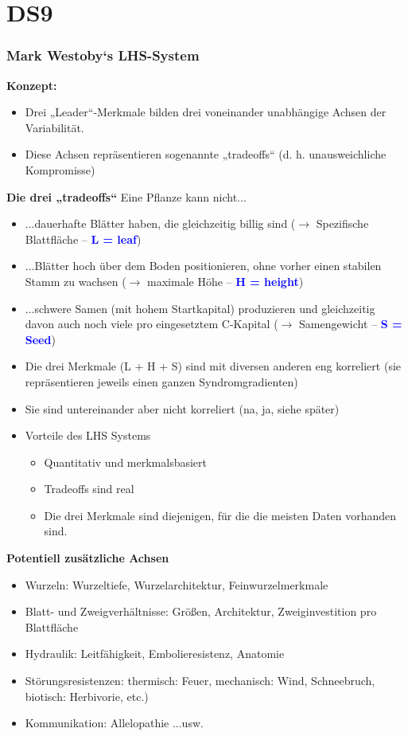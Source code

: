 \section{DS9}
\subsubsection{Mark Westoby‘s LHS-System}
\textbf{Konzept:}
\begin{itemize}
	\item Drei „Leader“-Merkmale bilden drei voneinander unabhängige Achsen der Variabilität.
	\item Diese Achsen repräsentieren sogenannte „tradeoffs“ (d. h. unausweichliche Kompromisse)
\end{itemize}

\textbf{Die drei „tradeoffs“}
Eine Pflanze kann nicht...
\begin{itemize}
	\item ...dauerhafte Blätter haben, die gleichzeitig billig sind ($\rightarrow$ Spezifische Blattfläche – \textcolor{blue}{\textbf{L = leaf}})
	\item ...Blätter hoch über dem Boden positionieren, ohne vorher einen stabilen Stamm zu wachsen ($\rightarrow$ maximale Höhe – \textcolor{blue}{\textbf{H = height}})
	\item ...schwere Samen (mit hohem Startkapital) produzieren und gleichzeitig davon auch noch viele pro eingesetztem C-Kapital ($\rightarrow$ Samengewicht – \textcolor{blue}{\textbf{S = Seed}})
	\item Die drei Merkmale (L + H + S) sind mit diversen anderen eng korreliert (sie repräsentieren jeweils einen ganzen Syndromgradienten)
	\item Sie sind untereinander aber nicht korreliert (na, ja, siehe später)
	\item Vorteile des LHS Systems
	\begin{itemize}
		\item Quantitativ und merkmalsbasiert
		\item Tradeoffs sind real
		\item Die drei Merkmale sind diejenigen, für die die meisten Daten vorhanden sind.
	\end{itemize}
\end{itemize}

\textbf{Potentiell zusätzliche Achsen}
\begin{itemize}
	\item Wurzeln: Wurzeltiefe, Wurzelarchitektur, Feinwurzelmerkmale
	\item Blatt- und Zweigverhältnisse: Größen, Architektur, Zweiginvestition pro Blattfläche
	\item Hydraulik: Leitfähigkeit, Embolieresistenz, Anatomie
	\item Störungsresistenzen: thermisch: Feuer, mechanisch: Wind, Schneebruch, biotisch: Herbivorie, etc.)
	\item Kommunikation: Allelopathie ...usw.
\end{itemize}

